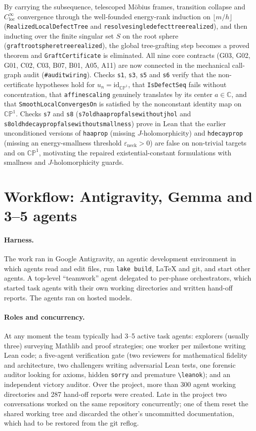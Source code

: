 \documentclass[11pt]{article}
\renewcommand{\_}{\origus\allowbreak}
\newcommand{\CP}{\mathbb{CP}^1}
\newcommand{\C}{\mathbb{C}}
\newcommand{\eps}{\varepsilon}
\newcommand{\code}[1]{\texttt{#1}}
\begin{document}
By carrying the subsequence, telescoped M\"obius frames, transition collapse and
$C^\infty_{\mathrm{loc}}$ convergence through the well-founded energy-rank induction on
$\lfloor m/h\rfloor$ (\code{RealizedLocalDefectTree} and \code{resolve\_single\_defect\_tree\_realized}),
and then inducting over the finite singular set $S$ on the root sphere
(\code{graft\_root\_sphere\_tree\_realized}), the global tree-grafting step becomes a proved theorem
and \code{GraftCertificate} is eliminated. All nine core contracts (G03, G02, G01, C02, C03, B07,
B01, A05, A11) are now connected in the mechanical call-graph audit (\code{\#audit\_wiring}). Checks \code{s1}, \code{s3}, \code{s5} and \code{s6} verify that the non-certificate hypotheses hold for
$u_n=\mathrm{id}_{\CP}$, that \code{IsDefectSeq} fails without concentration, that
\code{affine\_scaling} genuinely translates by its center $a\in\C$, and that
\code{SmoothLocalConvergesOn} is satisfied by the nonconstant identity map on $\CP$.
Checks \code{s7} and \code{s8} (\code{s7\_old\_h\_aa\_prop\_false\_without\_jhol} and
\code{s8\_old\_h\_decay\_prop\_false\_without\_smallness}) prove in Lean that the earlier unconditioned
versions of \code{h\_aa\_prop} (missing $J$-holomorphicity) and \code{h\_decay\_prop} (missing an
energy-smallness threshold $\eps_{\mathrm{neck}}>0$) are false on non-trivial targets and on $\CP$,
motivating the repaired existential-constant formulations with smallness and $J$-holomorphicity guards.

\section{Workflow: Antigravity, Gemma and 3--5 agents}

\paragraph{Harness.} The work ran in Google Antigravity, an agentic development environment in
which agents read and edit files, run \code{lake build}, LaTeX and git, and start other agents. A
top-level ``teamwork'' agent delegated to per-phase orchestrators, which started task agents with
their own working directories and written hand-off reports. The agents ran on hosted models.

\paragraph{Roles and concurrency.} At any moment the team typically had 3--5 active task agents:
explorers (usually three) surveying Mathlib and proof strategies; one worker per milestone writing
Lean code; a five-agent verification gate (two reviewers for mathematical fidelity and
architecture, two challengers writing adversarial Lean tests, one forensic auditor looking for
axioms, hidden \code{sorry} and premature \verb|\leanok|); and an independent victory auditor.
Over the project, more than 300 agent working directories and 287 hand-off reports were created.
Late in the project two conversations worked on the same repository concurrently; one of them reset
the shared working tree and discarded the other's uncommitted documentation, which had to be
restored from the git reflog.
\end{document}
